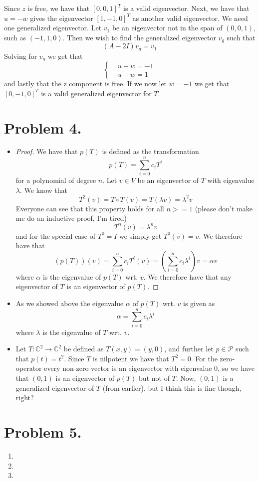 \documentclass[a4paper,11pt,norsk]{article}
\begin{document}
\begin{enumerate}
        Since $z$ is free, we have that $[0, 0, 1]^T$ is a valid eigenvector. Next, we have that 
        $u = -w$ gives the eigenvector $[1, -1, 0]^T$ as another valid eigenvector. We need one generalized eigenvector.
        Let $v_1$ be an eigenvector not in the span of $(0, 0, 1)$, such as $(-1, 1, 0)$. Then
        we wish to find the generalized eigenvector $v_g$ such that
        \[
            (A - 2I)v_g = v_1
        \]
        Solving for $v_g$ we get that
        \[
            \begin{cases}
                \:\:\,\,u + w = -1 \\
                -u - w = 1
            \end{cases}
        \]
        and lastly that the z component is free. If we now let $w = -1$ we get that $[0, -1, 0]^T$ is a valid 
        generalized eigenvector for $T$.
\end{enumerate}

\section*{Problem 4.}
\begin{itemize}
    \item 
        \begin{proof}
        We have that $p(T)$ is defined as the transformation 
        \[
            p(T) = \sum_{i=0}^{n} c_i T^i
        \]
        for a polynomial of degree $n$. Let $v \in V$ be an eigenvector of $T$ with eigenvalue $\lambda$. We know that 
        \[
            T^2(v) = T \circ T (v) = T(\lambda v) = \lambda^2 v
        \]
        Everyone can see that this property holds for all $n >= 1$ (please don't make me do an inductive proof, I'm tired)
        \[
            T^n(v) = \lambda^n v
        \]
        and for the special case of $T^0 = I$ we simply get $T^0(v) = v$. We therefore have that
        \[
            (p(T))(v) = \sum_{i=0}^{n} c_i T^i (v) = \left(\sum_{i=0}^{n} c_i \lambda^i\right) v = \alpha v
        \]
        where $\alpha$ is the eigenvalue of $p(T)$ wrt. $v$. We therefore have that any eigenvector of $T$ is an eigenvector of $p(T)$.
        \end{proof}
    \item As we showed above the eigenvalue $\alpha$ of $p(T)$ wrt. $v$ is given as 
        \[
            \alpha = \sum_{i=0}^n c_i \lambda^i
        \]
        where $\lambda$ is the eigenvalue of $T$ wrt. $v$.
    \item Let $T: \mathbb{C}^2 \to \mathbb{C}^2$ be defined as $T(x, y) = (y, 0)$, and further let $p \in \mathcal{P}$ such that
        $p(t) = t^2$. Since $T$ is nilpotent we have that $T^2 = 0$. For the zero-operator every non-zero vector is an eigenvector with eigenvalue 0,
        so we have that $(0, 1)$ is an eigenvector of $p(T)$ but not of $T$. Now, $(0, 1)$ is a generalized eigenvector of $T$ (from earlier), but I think
        this is fine though, right?
\end{itemize}

\section*{Problem 5.}
\begin{enumerate}
    \item
    \item
    \item
\end{enumerate}
\end{document}
